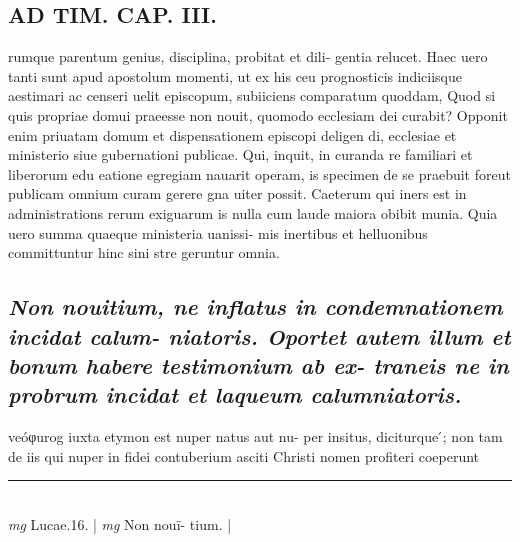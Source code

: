 \documentclass{article}
\begin{document}
\begin{pages}
\section*{AD TIM. CAP. III. }
\marginpar{[ p.129 ]}\pstart rumque parentum genius, disciplina, probitat et dili- gentia relucet. Haec uero tanti sunt apud apostolum momenti, ut ex his ceu prognosticis indiciisque aestimari ac censeri uelit episcopum, subiiciens comparatum quoddam, Quod si quis propriae domui praeesse non nouit, quomodo ecclesiam dei curabit? Opponit enim priuatam domum et dispensationem episcopi deligen di, ecclesiae et ministerio siue gubernationi publicae. Qui, inquit, in curanda re familiari et liberorum edu eatione egregiam nauarit operam, is specimen de se praebuit foreut publicam omnium curam gerere gna uiter possit. Caeterum qui iners est in administrations rerum exiguarum is nulla cum laude maiora obibit munia. Quia uero summa quaeque ministeria uanissi- mis inertibus et helluonibus committuntur hinc sini stre geruntur omnia.  \pend
{}
{}
\subsection*{\textit{Non nouitium, ne inflatus in condemnationem incidat calum- niatoris. Oportet autem illum et bonum habere testimonium ab ex- traneis ne in probrum incidat et laqueum calumniatoris. }}\pstart veóφurog iuxta etymon est nuper natus aut nu- per insitus, diciturque ́; non tam de iis qui nuper in fidei contuberium asciti Christi nomen profiteri coeperunt  \pend
\vspace{0.5cm}\noindent
\vspace{0.2cm}\rule{1cm}{0.2pt}\\ 
\hspace{0.2cm}\textit{mg}
\footnotesize Lucae.16. 
\normalsize| 
\hspace{0.2cm}\textit{mg}
\footnotesize Non nouï- tium. 
\normalsize| 

\end{pages}
\end{document}
